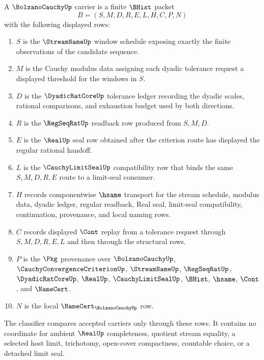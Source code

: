 \begin{definition}
\label{def:bolzano-cauchy-carrier}
A $\BolzanoCauchyUp$ carrier is a finite $\BHist$ packet
$$
B=(S,M,D,R,E,L,H,C,P,N)
$$
with the following displayed rows:
\begin{enumerate}
\item $S$ is the $\StreamNameUp$ window schedule exposing exactly the finite observations of the candidate sequence.
\item $M$ is the Cauchy modulus data assigning each dyadic tolerance request a displayed threshold for the windows in $S$.
\item $D$ is the $\DyadicRatCoreUp$ tolerance ledger recording the dyadic scales, rational comparisons, and exhaustion budget used by both directions.
\item $R$ is the $\RegSeqRatUp$ readback row produced from $S,M,D$.
\item $E$ is the $\RealUp$ seal row obtained after the criterion route has displayed the regular rational handoff.
\item $L$ is the $\CauchyLimitSealUp$ compatibility row that binds the same $S,M,D,R,E$ route to a limit-seal consumer.
\item $H$ records componentwise $\hsame$ transport for the stream schedule, modulus data, dyadic ledger, regular readback, Real seal, limit-seal compatibility, continuation, provenance, and local naming rows.
\item $C$ records displayed $\Cont$ replay from a tolerance request through $S,M,D,R,E,L$ and then through the structural rows.
\item $P$ is the $\Pkg$ provenance over $\BolzanoCauchyUp$, $\CauchyConvergenceCriterionUp$, $\StreamNameUp$, $\RegSeqRatUp$, $\DyadicRatCoreUp$, $\RealUp$, $\CauchyLimitSealUp$, $\BHist$, $\hsame$, $\Cont$, and $\NameCert$.
\item $N$ is the local $\NameCert_{\BolzanoCauchyUp}$ row.
\end{enumerate}
The classifier compares accepted carriers only through these rows. It contains no coordinate for ambient $\RealUp$ completeness, quotient stream equality, a selected host limit, trichotomy, open-cover compactness, countable choice, or a detached limit seal.
\end{definition}


